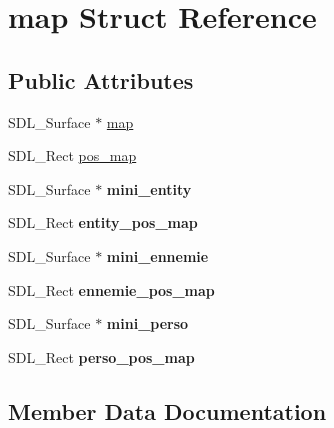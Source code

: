 \hypertarget{structmap}{}\section{map Struct Reference}
\label{structmap}
\subsection*{Public Attributes}
\begin{DoxyCompactItemize}
\item 
S\+D\+L\+\_\+\+Surface $\ast$ \hyperlink{structmap_a32daf60eeab6910e405dc049350b1e9c}{map}
\item 
S\+D\+L\+\_\+\+Rect \hyperlink{structmap_a892e2b0bcb168e8a85bd000b1bda0611}{pos\+\_\+map}
\item 
S\+D\+L\+\_\+\+Surface $\ast$ {\bfseries mini\+\_\+entity}\hypertarget{structmap_af5cb6ef5d8d995a8441e8bfc8fd5c862}{}\label{structmap_af5cb6ef5d8d995a8441e8bfc8fd5c862}

\item 
S\+D\+L\+\_\+\+Rect {\bfseries entity\+\_\+pos\+\_\+map}\hypertarget{structmap_acc2166f6c1dcbc1d8bb9a389b5bfb578}{}\label{structmap_acc2166f6c1dcbc1d8bb9a389b5bfb578}

\item 
S\+D\+L\+\_\+\+Surface $\ast$ {\bfseries mini\+\_\+ennemie}\hypertarget{structmap_a872c26a1739f796ecdb51a9a7fa137a0}{}\label{structmap_a872c26a1739f796ecdb51a9a7fa137a0}

\item 
S\+D\+L\+\_\+\+Rect {\bfseries ennemie\+\_\+pos\+\_\+map}\hypertarget{structmap_a5201fca77c6756807b5ba26371da1557}{}\label{structmap_a5201fca77c6756807b5ba26371da1557}

\item 
S\+D\+L\+\_\+\+Surface $\ast$ {\bfseries mini\+\_\+perso}\hypertarget{structmap_ad5f6a0f500cd8ef220867a7821223897}{}\label{structmap_ad5f6a0f500cd8ef220867a7821223897}

\item 
S\+D\+L\+\_\+\+Rect {\bfseries perso\+\_\+pos\+\_\+map}\hypertarget{structmap_a214838f7c4a02b8148a39fbcb013282a}{}\label{structmap_a214838f7c4a02b8148a39fbcb013282a}

\end{DoxyCompactItemize}


\subsection{Member Data Documentation}
